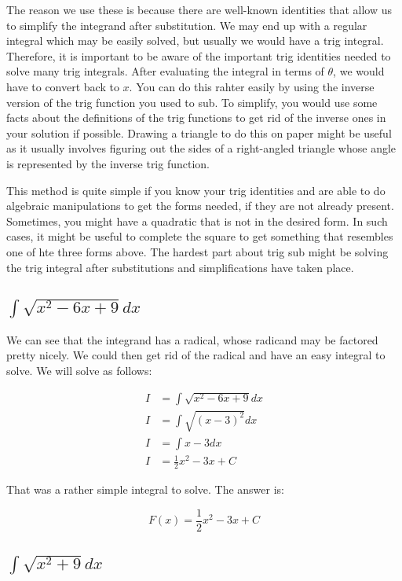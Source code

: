 \documentclass[12pt]{article}
\begin{document}
The reason we use these is because there are well-known identities that allow us to simplify the integrand after substitution.
We may end up with a regular integral which may be easily solved, but usually we would have a trig integral.
Therefore, it is important to be aware of the important trig identities needed to solve many trig integrals.
After evaluating the integral in terms of $\theta$, we would have to convert back to $x$.
You can do this rahter easily by using the inverse version of the trig function you used to sub.
To simplify, you would use some facts about the definitions of the trig functions to get rid of the inverse ones in your solution if possible.
Drawing a triangle to do this on paper might be useful as it usually involves figuring out the sides of a right-angled triangle whose angle is represented by the inverse trig function.

This method is quite simple if you know your trig identities and are able to do algebraic manipulations to get the forms needed, if they are not already present.
Sometimes, you might have a quadratic that is not in the desired form.
In such cases, it might be useful to complete the square to get something that resembles one of hte three forms above.
The hardest part about trig sub might be solving the trig integral after substitutions and simplifications have taken place.

\subsection{$\int \sqrt{x^2 - 6x + 9} dx$}

We can see that the integrand has a radical, whose radicand may be factored pretty nicely.
We could then get rid of the radical and have an easy integral to solve.
We will solve as follows:


\begin{align}
    I & = \int \sqrt{x^2 - 6x + 9} dx \\
    I & = \int \sqrt{(x-3)^2} dx      \\
    I & = \int x - 3 dx               \\
    I & = \frac{1}{2}x^2 - 3x + C
\end{align}


That was a rather simple integral to solve. The answer is:

$$
    F(x) = \frac{1}{2}x^2 - 3x + C
$$

\subsection{$\int \sqrt{x^2 + 9} dx$}
\end{document}
